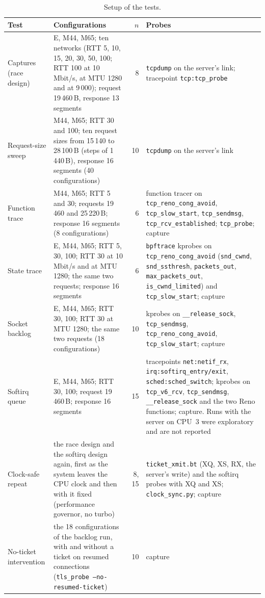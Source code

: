 \documentclass[9pt]{article}
\newcommand{\floatnote}[1]{\par\vspace{1pt}{\footnotesize\raggedright #1\par}} %
\begin{document}
\begin{table}[h]
\caption{Setup of the tests.}
\label{tab:setup}
\centering\footnotesize\setlength{\tabcolsep}{4pt}
\begin{tabular}{@{}p{}p{}rp{}@{}}
\toprule
Test & Configurations & $n$ & Probes\\
\midrule
Captures (race design) & E, M44, M65; ten networks (RTT 5, 10, 15, 20, 30, 50, 100; RTT 100 at 10 Mbit/s, at MTU 1280 and at 9\,000); request 19\,460\,B, response 13 segments & 8 & \texttt{tcpdump} on the server's link; tracepoint \texttt{tcp:tcp\_probe}\\
Request-size sweep & M44, M65; RTT 30 and 100; ten request sizes from 15\,140 to 28\,100\,B (steps of 1\,440\,B), response 16 segments (40 configurations) & 10 & \texttt{tcpdump} on the server's link\\
Function trace & M44, M65; RTT 5 and 30; requests 19\,460 and 25\,220\,B; response 16 segments (8 configurations) & 6 & function tracer on \texttt{tcp\_reno\_cong\_avoid}, \texttt{tcp\_slow\_start}, \texttt{tcp\_sendmsg}, \texttt{tcp\_rcv\_established}; \texttt{tcp\_probe}; capture\\
State trace & E, M44, M65; RTT 5, 30, 100; RTT 30 at 10 Mbit/s and at MTU 1280; the same two requests; response 16 segments & 6 & \texttt{bpftrace} kprobes on \texttt{tcp\_reno\_cong\_avoid} (\texttt{snd\_cwnd}, \texttt{snd\_ssthresh}, \texttt{packets\_out}, \texttt{max\_packets\_out}, \texttt{is\_cwnd\_limited}) and \texttt{tcp\_slow\_start}; capture\\
Socket backlog & E, M44, M65; RTT 30, 100; RTT 30 at MTU 1280; the same two requests (18 configurations) & 10 & kprobes on \texttt{\_\_release\_sock}, \texttt{tcp\_sendmsg}, \texttt{tcp\_reno\_cong\_avoid}, \texttt{tcp\_slow\_start}; capture\\
Softirq queue & E, M44, M65; RTT 30, 100; request 19\,460\,B; response 16 segments & 15 & tracepoints \texttt{net:netif\_rx}, \texttt{irq:softirq\_entry/exit}, \texttt{sched:sched\_switch}; kprobes on \texttt{tcp\_v6\_rcv}, \texttt{tcp\_sendmsg}, \texttt{\_\_release\_sock} and the two Reno functions; capture. Runs with the server on CPU~3 were exploratory and are not reported\\
Clock-safe repeat & the race design and the softirq design again, first as the system leaves the CPU clock and then with it fixed (performance governor, no turbo) & 8, 15 & \texttt{ticket\_xmit.bt} (XQ, XS, RX, the server's write) and the softirq probes with XQ and XS; \texttt{clock\_sync.py}; capture\\
No-ticket intervention & the 18 configurations of the backlog run, with and without a ticket on resumed connections (\texttt{tls\_probe --no-resumed-ticket}) & 10 & capture\\
\bottomrule
\end{tabular}
\floatnote{XQ, XS, and RX are defined in the section on the repeat with every event on one clock.}
\end{table}
\end{document}
